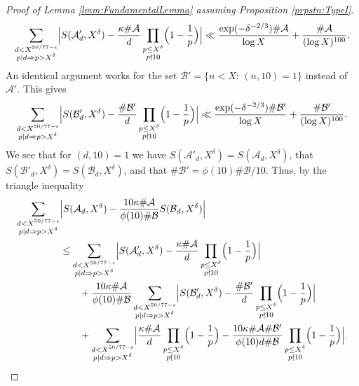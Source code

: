 \documentclass[10pt]{amsart}
\theoremstyle{plain}
\numberwithin{sblmm}{thrm}
\numberwithin{equation}{section}
\begin{document}
\begin{proof}[Proof of Lemma \ref{lmm:FundamentalLemma} assuming Proposition \ref{prpstn:TypeI}]
%
\begin{equation}
\sum_{\substack{d<X^{50/77-\epsilon}\\ p|d\Rightarrow p>X^{\delta}}}\Bigl|S(\mathcal{A}'_{d},X^{\delta})-\frac{\kappa\#\mathcal{A}{}}{d}\prod_{\substack{p\le X^{\delta}\\ p\nmid 10}}\Bigl(1-\frac{1}{p}\Bigr)\Bigr|\ll \frac{\exp(-\delta^{-2/3})\#\mathcal{A}}{\log{X}}+\frac{\#\mathcal{A}}{(\log{X})^{100}}.
\label{eq:FundSplit}
\end{equation}
%
An identical argument works for the set $\mathcal{B}'=\{n<  X:\,(n,10)=1\}$ instead of $\mathcal{A}'$. This gives
%
\begin{equation}
\sum_{\substack{d<X^{50/77-\epsilon}\\ p|d\Rightarrow p>X^{\delta}}}\Bigl|S(\mathcal{B}_{d}',X^{\delta})-\frac{\#\mathcal{B}'}{d}\prod_{\substack{p\le X^\delta \\ p\nmid 10}}\Bigl(1-\frac{1}{p}\Bigr)\Bigr|\ll \frac{\exp(-\delta^{-2/3})\#\mathcal{B}'}{\log{X}}+\frac{\#\mathcal{B}'}{(\log{X})^{100}}.
\label{eq:FundB}
\end{equation}
%
We see that for $(d,10)=1$ we have $S(\mathcal{A}'_d,X^{\delta})=S(\mathcal{A}{}_d,X^{\delta})$, that $S(\mathcal{B}'_d,X^{\delta})=S(\mathcal{B}{}_d,X^{\delta})$, and that $\#\mathcal{B}'=\phi(10)\#\mathcal{B}{}/10$. Thus, by the triangle inequality
%
\begin{align*}
\sum_{\substack{d<X^{50/77-\epsilon}\\ p|d\Rightarrow p>X^{\delta}}}&\Bigl|S(\mathcal{A}{}_{d},X^{\delta})-\frac{10\kappa\#\mathcal{A}{}}{\phi(10)\#\mathcal{B}{}}S(\mathcal{B}{}_d,X^{\delta})\Bigr|\\
&\le \sum_{\substack{d<X^{50/77-\epsilon}\\ p|d\Rightarrow p>X^{\delta}}}\Bigl|S(\mathcal{A}_{d}',X^{\delta})-\frac{\kappa\#\mathcal{A}{}}{d}\prod_{\substack{p\le X^\delta \\ p\nmid 10}}\Bigl(1-\frac{1}{p}\Bigr)\Bigr|\\
&\qquad+\frac{10\kappa\#\mathcal{A}{}}{\phi(10)\#\mathcal{B}{}}\sum_{\substack{d<X^{50/77-\epsilon}\\ p|d\Rightarrow p>X^{\delta}}}\Bigl|S(\mathcal{B}_{d}',X^{\delta})-\frac{\#\mathcal{B}'}{d}\prod_{\substack{p\le X^\delta \\ p\nmid 10}}\Bigl(1-\frac{1}{p}\Bigr)\Bigr|\\
&\qquad+\sum_{\substack{d<X^{50/77-\epsilon}\\ p|d\Rightarrow p>X^{\delta}}}\Bigl|\frac{\kappa\#\mathcal{A}{}}{d}\prod_{\substack{p\le X^\delta \\ p\nmid 10}}\Bigl(1-\frac{1}{p}\Bigr)-\frac{10\kappa\#\mathcal{A}{}\#\mathcal{B}'}{\phi(10)d \#\mathcal{B}{}}\prod_{\substack{p\le X^\delta \\ p\nmid 10}}\Bigl(1-\frac{1}{p}\Bigr)\Bigr|.

\end{align*}
\end{proof}
\end{document}
